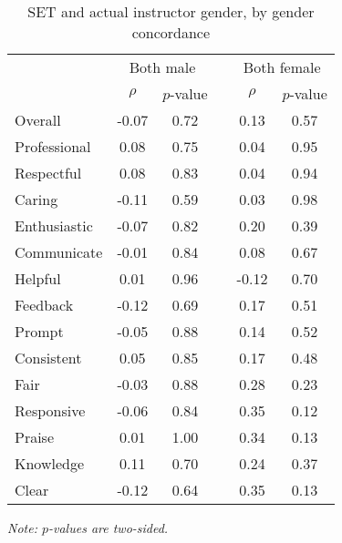 \documentclass[12pt]{article}
\newcommand{\todo}[1]{{\color{red}{TO DO: \sc #1}}}
\begin{document}
\todo{For consistency, I think we should report differences in means rather than $\rho$.}
\begin{table}[htbp]
  \centering
  \footnotesize 
  \caption{SET and actual instructor gender, by gender concordance}
    \begin{tabular}{lccccc}
    \toprule 
          & \multicolumn{2}{c}{Both male}  &  & \multicolumn{2}{c}{Both female} \\
                          & $\rho$  &  $p$-value &  & $\rho$  &  $p$-value    \\
                          
   \midrule
    Overall &                -0.07       & 0.72 & &  0.13    & 0.57   \\
    Professional &            0.08       & 0.75 & &  0.04    & 0.95   \\
    Respectful	      &  0.08       & 0.83 & &  0.04    & 0.94   \\
    Caring &                 -0.11       & 0.59 & &  0.03    & 0.98  \\
    Enthusiastic   &         -0.07       & 0.82 & &  0.20    & 0.39   \\
    Communicate        &     -0.01       & 0.84 & &  0.08    & 0.67  \\
    Helpful   &               0.01       & 0.96 & & -0.12    & 0.70   \\
    Feedback   &             -0.12       & 0.69 & &  0.17    & 0.51   \\
    Prompt    &              -0.05       & 0.88 & &  0.14    & 0.52   \\
    Consistent   &            0.05       & 0.85 & &  0.17    & 0.48   \\
    Fair   &                 -0.03       & 0.88 & &  0.28    & 0.23  \\
    Responsive   &           -0.06       & 0.84 & &  0.35    & 0.12  \\
    Praise   &                0.01       & 1.00 & &  0.34    & 0.13  \\
    Knowledge   &             0.11       & 0.70 & &  0.24    & 0.37  \\
    Clear   &                -0.12       & 0.64 & &  0.35    & 0.13  \\
    \bottomrule
    \end{tabular}%
 \label{tab:macnell3}%

  \textit{Note: $p$-values are two-sided.}  
\end{table}%
\normalsize
\end{document}
